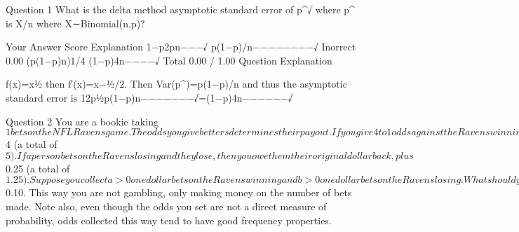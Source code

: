 
Question 1
What is the delta method asymptotic standard error of p^√ where p^ is X/n where X∼Binomial(n,p)?

Your Answer		Score	Explanation
1−p2pn−−−√			
p(1−p)/n−−−−−−−−√	Inorrect	0.00	
(p(1−p)n)1/4			
(1−p)4n−−−−√			
Total		0.00 / 1.00	
Question Explanation

f(x)=x½ then f′(x)=x−½/2. Then Var(p^)=p(1−p)/n and thus the asymptotic standard error is
12p½p(1−p)n−−−−−−−√=(1−p)4n−−−−−−√


Question 2
You are a bookie taking $1 bets on the NFL Ravens game. The odds you give betters determines their payout. If you give 4 to 1 odds against the Ravens winning, then if a person bets on the Ravens winning and they win, you owe them their original dollar, plus an additional $4 (a total of $5). If a person bets on the Ravens losing and they lose, then you owe them their original dollar back, plus $0.25 (a total of $1.25).

Suppose you collect a > 0 one dollar bets on the Ravens winning and b > 0 one dollar bets on the Ravens losing. What should you set the odds so that, regardless of the outcome of the game, you neither win nor lose money? Note, in this case, the betters place their bets and learn the odds later. Note also, the odds are something that you set in this case, not a direct measure of probability or randomness.

Your Answer		Score	Explanation
(b+1)/(a+1)			
b/a			
a/b			
(a+1)/(b+1)	Inorrect	0.00	
Total		0.00 / 1.00	
Question Explanation

Suppose that you give odds against the Ravens of H. If the Ravens win, you owe
Ha+a−(a+b)
where Ha+a is the payout for those that bet on the Ravens winning, plus their original dollars back, and (a+b) is the amount of money that you collected.

If the Ravens lose, you owe
b/H+b−(a+b)
where b/H+b is the payout for those betting on the Ravens losing, plus their original dollars back and (a+b) is the amount that you collected.

Solving either equation for 0 yeilds H=b/a.

Note, how do you make money as a bookie? You charge a convenience fee for accepting the bet, say of $0.10. This way you are not gambling, only making money on the number of bets made. Note also, even though the odds you set are not a direct measure of probability, odds collected this way tend to have good frequency properties.

